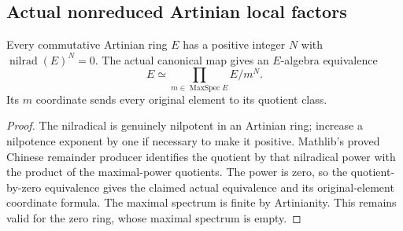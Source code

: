 \subsection{Actual nonreduced Artinian local factors}
\label{subsec:artinian-local-factors}

\begin{theorem}
\label{algebra:artinian-local-power-decomposition}
\leanok
Every commutative Artinian ring $E$ has a positive integer $N$ with
$\operatorname{nilrad}(E)^N=0$. The actual canonical map gives an
$E$-algebra equivalence
\[
 E\simeq\prod_{m\in\operatorname{MaxSpec}E}E/m^N.
\]
Its $m$ coordinate sends every original element to its quotient class.
\end{theorem}
\begin{proof}
The nilradical is genuinely nilpotent in an Artinian ring; increase a
nilpotence exponent by one if necessary to make it positive. Mathlib's
proved Chinese remainder producer identifies the quotient by that
nilradical power with the product of the maximal-power quotients.
The power is zero, so the quotient-by-zero equivalence gives the
claimed actual equivalence and its original-element coordinate formula.
The maximal spectrum is finite by Artinianity. This remains valid
for the zero ring, whose maximal spectrum is empty.
\end{proof}

